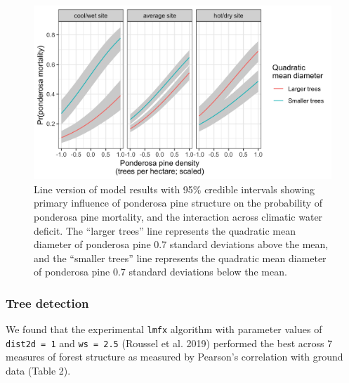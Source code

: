 \documentclass[]{article}
\begin{document}
\begin{figure}
\centering
\includegraphics{../../figures/pipo_tpha_qmd_cwd_interaction.png}
\caption{Line version of model results with 95\% credible intervals
showing primary influence of ponderosa pine structure on the probability
of ponderosa pine mortality, and the interaction across climatic water
deficit. The ``larger trees'' line represents the quadratic mean
diameter of ponderosa pine 0.7 standard deviations above the mean, and
the ``smaller trees'' line represents the quadratic mean diameter of
ponderosa pine 0.7 standard deviations below the mean.}
\end{figure}

\subsubsection{Tree detection}\label{tree-detection-1}

We found that the experimental \texttt{lmfx} algorithm with parameter
values of \texttt{dist2d\ =\ 1} and \texttt{ws\ =\ 2.5} (Roussel et al.
2019) performed the best across 7 measures of forest structure as
measured by Pearson's correlation with ground data (Table 2).
\end{document}
